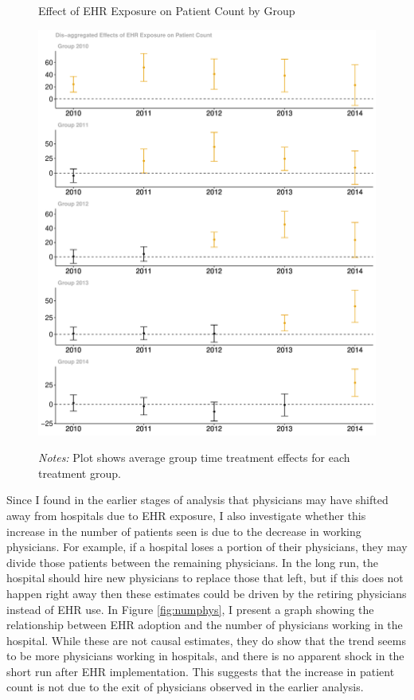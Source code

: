 \documentclass[12pt]{article}
\begin{document}
\begin{figure}[ht!]
    \centering
    \captionsetup{width=.6\linewidth}
    \caption{Effect of EHR Exposure on Patient Count by Group}
    \includegraphics[scale=.47]{Objects/patient_group.pdf}
    \label{fig:patientgroup}
    \vspace{2mm}
    \caption*{\footnotesize{\textit{Notes:} Plot shows average group time treatment effects for each treatment group.}}
\end{figure}

Since I found in the earlier stages of analysis that physicians may have shifted away from hospitals due to EHR exposure, I also investigate whether this increase in the number of patients seen is due to the decrease in working physicians. For example, if a hospital loses a portion of their physicians, they may divide those patients between the remaining physicians. In the long run, the hospital should hire new physicians to replace those that left, but if this does not happen right away then these estimates could be driven by the retiring physicians instead of EHR use. In Figure \ref{fig:numphys}, I present a graph showing the relationship between EHR adoption and the number of physicians working in the hospital. While these are not causal estimates, they do show that the trend seems to be more physicians working in hospitals, and there is no apparent shock in the short run after EHR implementation. This suggests that the increase in patient count is not due to the exit of physicians observed in the earlier analysis. 
\end{document}
